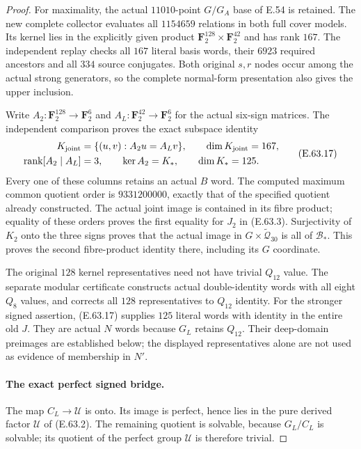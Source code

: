 \begin{proof}
For maximality, the actual $11010$-point $G/G_A$
base of E.54 is retained. The new complete collector
evaluates all $1154659$ relations in both full cover
models. Its kernel lies in the explicitly given
product $\mathbf F_2^{128}\times\mathbf F_2^{42}$
and has rank $167$. The independent replay checks
all $167$ literal basis words, their $6923$ required
ancestors and all $334$ source conjugates. Both
original $s,r$ nodes occur among the actual strong
generators, so the complete normal-form presentation
also gives the upper inclusion.

Write $A_2:\mathbf F_2^{128}\to\mathbf F_2^6$ and
$A_L:\mathbf F_2^{42}\to\mathbf F_2^6$ for the
actual six-sign matrices. The independent comparison
proves the exact subspace identity
\[
 \begin{split}
 K_{\rm joint}
    &=\{(u,v):A_2u=A_Lv\},\qquad\dim K_{\rm joint}=167,\\
 \operatorname{rank}[A_2\mid A_L]&=3,
       \qquad\ker A_2=K_*,\qquad\dim K_*=125.
 \end{split}
 \tag{E.63.17}
\]
Every one of these columns retains an actual $B$ word.
The computed maximum common quotient order is
$9331200000$, exactly that of the specified quotient
already constructed. The actual joint image is
contained in its fibre product; equality of these
orders proves the first equality for $J_2$ in
\textup{(E.63.3)}. Surjectivity of $K_2$ onto the
three signs proves that the actual image in
$G\times\widetilde{\mathcal Q}_{30}$ is all of
$\mathcal B_*$. This proves the second fibre-product
identity there, including its $G$ coordinate.

The original $128$ kernel representatives need not
have trivial $Q_{12}$ value. The separate modular
certificate constructs actual double-identity words
with all eight $Q_8$ values, and corrects all $128$
representatives to $Q_{12}$ identity. For the stronger
signed assertion, \textup{(E.63.17)} supplies $125$
literal words with identity in the entire old $J$.
They are actual $N$ words because $G_L$ retains
$Q_{12}$. Their deep-domain preimages are established
below; the displayed representatives alone are not
used as evidence of membership in $N'$.

\paragraph{The exact perfect signed bridge.}
The map $C_L\to\mathcal U$ is onto. Its image is
perfect, hence lies in the pure derived factor
$\mathcal U$ of \textup{(E.63.2)}. The remaining
quotient is solvable, because $G_L/C_L$ is solvable;
its quotient of the perfect group $\mathcal U$ is
therefore trivial.


\end{proof}
